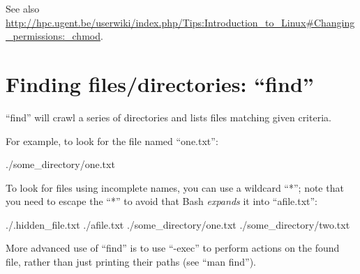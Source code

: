 See also \url{http://hpc.ugent.be/userwiki/index.php/Tips:Introduction_to_Linux#Changing_permissions:_chmod}.

\section{Finding files/directories: ``find''}

``find'' will crawl a series of directories and lists files matching given criteria.

For example, to look for the file named ``one.txt'':

\begin{prompt}
./some_directory/one.txt
\end{prompt}

To look for files using incomplete names, you can use a wildcard ``*''; note
that you need to escape the ``*'' to avoid that Bash \emph{expands} it into
``afile.txt'':

\begin{prompt}
./.hidden_file.txt
./afile.txt
./some_directory/one.txt
./some_directory/two.txt
\end{prompt}

More advanced use of ``find'' is to use ``-exec'' to perform actions on the
found file, rather than just printing their paths (see ``man find'').
